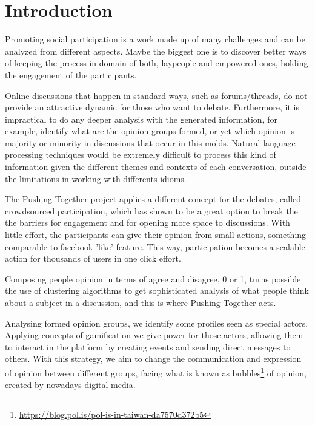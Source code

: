\documentclass{llncs}
\begin{document}
\section{Introduction}
\label{sec:intro}
  Promoting social participation is a work made up of many challenges and can be
  analyzed from different aspects. Maybe the biggest one is to discover better
  ways of keeping the process in domain of both, laypeople and empowered ones,
  holding the engagement of the participants.

  Online discussions that happen in standard ways, such as forums/threads, do not
  provide an attractive dynamic for those who want to debate. Furthermore, it is
  impractical to do any deeper analysis with the generated information, for example,
  identify what are the opinion groups formed, or yet which opinion is majority
  or minority in discussions that occur in this molds. Natural language processing
  techniques would be extremely difficult to process this kind of information
  given the different themes and contexts of each conversation, outside the
  limitations in working with differents idioms.

  The Pushing Together project applies a different concept for the debates,
  called crowdsourced participation, which has shown to be a great option to break the
  the barriers for engagement and for opening more space to discussions. With little
  effort, the participants can give their opinion from small actions,
  something comparable to facebook 'like' feature. This way, participation becomes
  a scalable action for thousands of users in one click effort.

  Composing people opinion in terms of agree and disagree, 0 or 1, turns possible
  the use of clustering algorithms to get sophisticated analysis of what people
  think about a subject in a discussion, and this is where Pushing Together acts.

  Analysing formed opinion groups, we identify some profiles seen as special actors.
  Applying concepts of gamification we give power for those actors, allowing
  them to interact in the platform by creating events and sending direct messages
  to others. With this strategy, we aim to change the communication and expression
  of opinion between different groups, facing what is known as
  bubbles\footnote{\url{https://blog.pol.is/pol-is-in-taiwan-da7570d372b5}} of
  opinion, created by nowadays digital media.  

\end{document}
